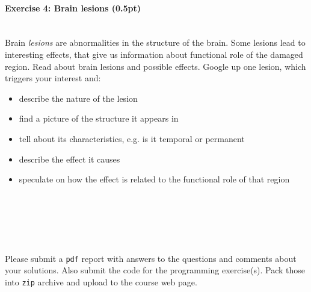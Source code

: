 \documentclass[a4paper,11pt]{article}
\newenvironment{exercise}[3]{\paragraph{Exercise #1: #2 (#3pt)}\ \\}{
\medskip}
\begin{document}
\begin{exercise}{4}{Brain lesions}{0.5}
Brain \emph{lesions} are abnormalities in the structure of the brain. Some lesions lead to interesting effects, that give us information about functional role of the damaged region. Read about brain lesions and possible effects. Google up one lesion, which triggers your interest and:
\begin{itemize}
\itemsep 0em
	\item describe the nature of the lesion
	\item find a picture of the structure it appears in
	\item tell about its characteristics, e.g. is it temporal or permanent
	\item describe the effect it causes
	\item speculate on how the effect is related to the functional role of that region
\end{itemize}
\end{exercise}
\ \\
\ \\
\ \\
\ \\
\ \\
Please submit a \texttt{pdf} report with answers to the questions and comments about your solutions. Also submit the code for the programming exercise(s). Pack those into \texttt{zip} archive and upload to the course web page.
\end{document}
